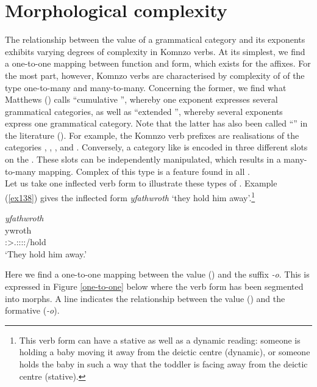 \section{Morphological complexity} \label{verbprelim}

The relationship between the value of a grammatical category and its exponents exhibits varying degrees of complexity in Komnzo verbs. At its simplest, we find a one-to-one mapping between function and form, which exists for the  affixes. For the most part, however, Komnzo verbs are characterised by complexity of  of the type one-to-many and many-to-many. Concerning the former, we find what Matthews (\citeyear[147-149]{Matthews:1979vm}) calls ``cumulative '', whereby one exponent expresses several grammatical categories, as well as ``extended '', whereby several exponents express one grammatical category. Note that the latter has also been called ``'' in the literature (\citealt[163]{Caballero:2012vr}). For example, the Komnzo verb prefixes are  realisations of the categories , , ,  and . Conversely, a category like  is encoded in three different slots on the . These slots can be independently manipulated, which results in a many-to-many mapping. Complex  of this type is a feature found in all .\\

Let us take one inflected verb form to illustrate these types of . Example (\ref{ex138}) gives the inflected  form \emph{yfathwroth} `they hold him away'.\footnote{This verb form can have a stative as well as a dynamic reading: someone is holding a baby moving it away from the deictic centre (dynamic), or someone holds the baby in such a way that the toddler is facing away from the deictic centre (stative).}

\begin{exe}
	\ex \emph{yfathwroth}\\
	\gll ywroth\\
	\Stpl:\Sbj>\Tsg.\Masc:\Obj:\Nonpast:\Ipfv:\Andat/hold\\
	\trans `They hold him away.'
	\label{ex138}
\end{exe}

Here we find a one-to-one mapping between the  value () and the suffix \emph{-o}. This is expressed in Figure \ref{one-to-one} below where the verb form has been segmented into morphs. A line indicates the  relationship between the value (\Andat) and the formative (\emph{-o}).

